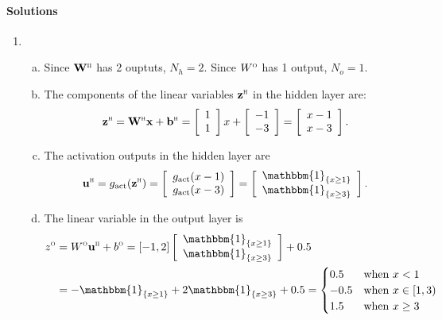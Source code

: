 \documentclass[11pt]{article}
\newcommand{\bbf}{\mathbf{b}}
\newcommand{\ubf}{\mathbf{u}}
\newcommand{\xbf}{\mathbf{x}}
\newcommand{\zbf}{\mathbf{z}}
\newcommand{\Wbf}{\mathbf{W}}
\newcommand{\indic}[1]{\mathbbm{1}_{ \{ {#1} \} }}
\def\hid{\textsc{\tiny H}}
\def\out{\textsc{\tiny O}}
\begin{document}
\paragraph*{Solutions}
\begin{enumerate}
\item
\begin{enumerate}[(a)]
\item Since $\Wbf^\hid$ has 2 ouptuts, $N_h=2$.
Since $W^\out$ has 1 output, $N_o=1$.

\item The components of the linear variables $\zbf^\hid$ in the hidden layer are:
\[
    \zbf^\hid = \Wbf^\hid\xbf + \bbf^\hid =
    \left[ \begin{array}{c} 1 \\ 1 \end{array} \right]x +
    \left[ \begin{array}{c} -1 \\ -3 \end{array} \right] =
    \left[ \begin{array}{c} x-1 \\ x-3 \end{array} \right].
\]


\item The activation outputs in the hidden layer are
\[
    \ubf^\hid = g_{\rm act}(\zbf^\hid) =
     \left[ \begin{array}{c} g_{\rm act}(x-1) \\ g_{\rm act}(x-3) \end{array} \right]
     =
     \left[ \begin{array}{c} \indic{x \geq 1} \\ \indic{x \geq 3} \end{array} \right].
\]

\item The linear variable in the output layer is
\begin{align*}
    z^\out &= W^\out \ubf^\hid + b^\out =
    [-1, 2]\left[ \begin{array}{c} \indic{x \geq 1} \\ \indic{x \geq 3} \end{array} \right]
    + 0.5 \\
    &= -\indic{x \geq 1} +2\indic{x \geq 3} + 0.5
    = \begin{cases}
        0.5 & \mbox{when } x < 1 \\
        -0.5 & \mbox{when } x \in [1,3) \\
        1.5 & \mbox{when } x \geq 3
     \end{cases}
\end{align*}


\end{enumerate}
\end{enumerate}
\end{document}
